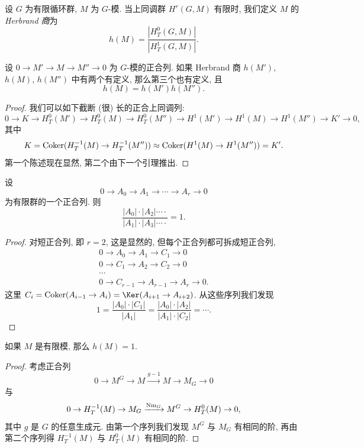 设 $G$ 为有限循环群, $M$ 为 $G$-模. 当上同调群 $H^r(G,M)$ 有限时, 我们定义 $M$ 的\emph{Herbrand 商}为
\[
 h(M)=\frac{|H_T^0(G,M)|}{|H_T^1(G,M)|}.
\]

\begin{proposition}\label{prop:ii.3.6}
设 $0\to M'\to M\to M''\to 0$ 为 $G$-模的正合列. 如果 Herbrand 商 $h(M')$, $h(M)$, $h(M'')$ 中有两个有定义, 那么第三个也有定义, 且
\[
 h(M)=h(M')h(M'').
\]
\end{proposition}

\begin{proof}
我们可以如下截断 (很) 长的正合上同调列:
\[
 0\to K\to H_T^0(M')\to H_T^0(M)\to H_T^0(M'')\to H^1(M')\to H^1(M)\to H^1(M'')\to K'\to 0,
\]
其中
\[
 K=\operatorname{Coker}(H_T^{-1}(M)\to H_T^{-1}(M''))\approx \operatorname{Coker}(H^1(M)\to H^1(M''))=K'.
\]
第一个陈述现在显然, 第二个由下一个引理推出.
\end{proof}

\begin{lemma}\label{lem:ii.3.7}
设
\[
 0\to A_0\to A_1\to\cdots\to A_r\to 0
\]
为有限群的一个正合列. 则
\[
 \frac{|A_0|\cdot |A_2|\cdots\cdot}{|A_1|\cdot |A_3|\cdots\cdot}=1.
\]
\end{lemma}

\begin{proof}
对短正合列, 即 $r=2$, 这是显然的, 但每个正合列都可拆成短正合列,
\[
 \begin{aligned}
 0\to A_0\to A_1\to C_1\to 0\\
 0\to C_1\to A_2\to C_2\to 0\\
 \cdots\\
 0\to C_{r-1}\to A_{r-1}\to A_r\to 0.
 \end{aligned}
\]
这里 $C_i=\Coker(A_{i-1}\to A_i)=\Ker(A_{i+1}\to A_{i+2})$. 从这些序列我们发现
\[
 1=\frac{|A_0|\cdot |C_1|}{|A_1|}=\frac{|A_0|\cdot |A_2|}{|A_1|\cdot |C_2|}=\cdots.
\]
\end{proof}

\begin{proposition}\label{prop:ii.3.8}
如果 $M$ 是有限模, 那么 $h(M)=1$.
\end{proposition}

\begin{proof}
考虑正合列
\[
 0\to M^G\to M\xrightarrow{g-1} M\to M_G\to 0
\]
与
\[
 0\to H_T^{-1}(M)\to M_G\xrightarrow{\operatorname{Nm}_G} M^G\to H_T^0(M)\to 0,
\]
其中 $g$ 是 $G$ 的任意生成元. 由第一个序列我们发现 $M^G$ 与 $M_G$ 有相同的阶, 再由第二个序列得 $H_T^{-1}(M)$ 与 $H_T^0(M)$ 有相同的阶.
\end{proof}

